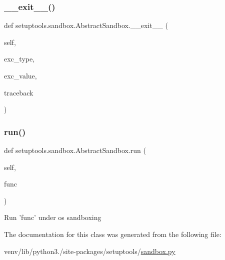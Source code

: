 \mbox{\label{classsetuptools_1_1sandbox_1_1AbstractSandbox_adbfcba2aa94e7498b701864192f0576b}} 
\subsubsection{\texorpdfstring{\+\_\+\+\_\+exit\+\_\+\+\_\+()}{\_\_exit\_\_()}}
{\footnotesize\ttfamily def setuptools.\+sandbox.\+Abstract\+Sandbox.\+\_\+\+\_\+exit\+\_\+\+\_\+ (\begin{DoxyParamCaption}\item[{}]{self,  }\item[{}]{exc\+\_\+type,  }\item[{}]{exc\+\_\+value,  }\item[{}]{traceback }\end{DoxyParamCaption})}

\mbox{\label{classsetuptools_1_1sandbox_1_1AbstractSandbox_a1a04bbba7a8e1a1afe0446d5b70c0dca}} 
\subsubsection{\texorpdfstring{run()}{run()}}
{\footnotesize\ttfamily def setuptools.\+sandbox.\+Abstract\+Sandbox.\+run (\begin{DoxyParamCaption}\item[{}]{self,  }\item[{}]{func }\end{DoxyParamCaption})}

\begin{DoxyVerb}Run 'func' under os sandboxing\end{DoxyVerb}
 

The documentation for this class was generated from the following file\+:\begin{DoxyCompactItemize}
\item 
venv/lib/python3./site-\/packages/setuptools/\hyperlink{sandbox_8py}{sandbox.\+py}\end{DoxyCompactItemize}
